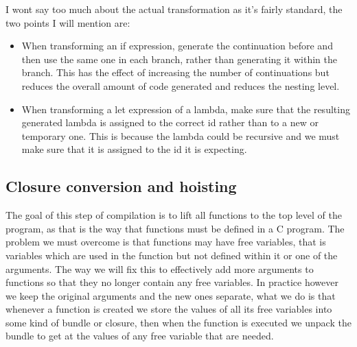 \documentclass[a4paper]{article}
\begin{document}
I wont say too much about the actual transformation as it's fairly standard, the two points I will mention are:
\begin{itemize}
\item
	When transforming an if expression, generate the continuation before and then use the same one in each branch, rather than generating it within the branch. This has the effect of increasing the number of continuations but reduces the overall amount of code generated and reduces the nesting level.

\item
	When transforming a let expression of a lambda, make sure that the resulting generated lambda is assigned to the correct id rather than to a new or temporary one. This is because the lambda could be recursive and we must make sure that it is assigned to the id it is expecting. 

\end{itemize}




\subsection{Closure conversion and hoisting}

The goal of this step of compilation is to lift all functions to the top level of the program, as that is the way that functions must be defined in a C program. The problem we must overcome is that functions may have free variables, that is variables which are used in the function but not defined within it or one of the arguments. The way we will fix this to effectively add more arguments to functions so that they no longer contain any free variables. In practice however we keep the original arguments and the new ones separate, what we do is that whenever a function is created we store the values of all its free variables into some kind of bundle or closure, then when the function is executed we unpack the bundle to get at the values of any free variable that are needed.
\end{document}
